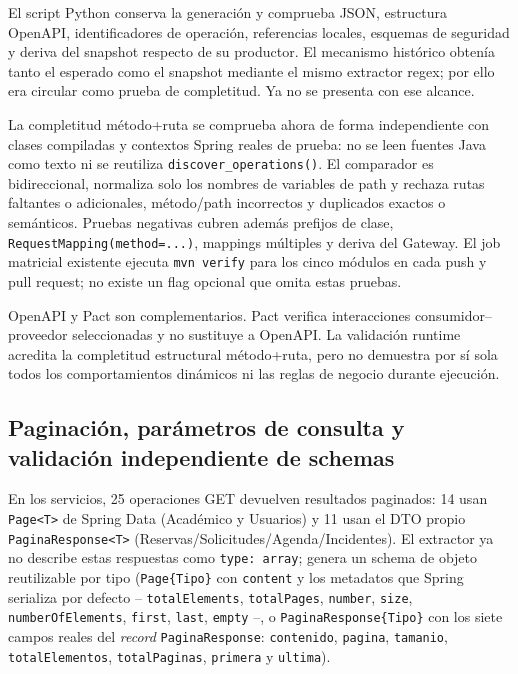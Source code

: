 El script Python conserva la generación y comprueba JSON, estructura OpenAPI,
identificadores de operación, referencias locales, esquemas de seguridad y
deriva del snapshot respecto de su productor. El mecanismo histórico obtenía
tanto el esperado como el snapshot mediante el mismo extractor regex; por ello
era circular como prueba de completitud. Ya no se presenta con ese alcance.

La completitud método+ruta se comprueba ahora de forma independiente con clases
compiladas y contextos Spring reales de prueba: no se leen fuentes Java como
texto ni se reutiliza \texttt{discover\_operations()}. El comparador es
bidireccional, normaliza solo los nombres de variables de path y rechaza rutas
faltantes o adicionales, método/path incorrectos y duplicados exactos o
semánticos. Pruebas negativas cubren además prefijos de clase,
\texttt{RequestMapping(method=...)}, mappings múltiples y deriva del Gateway.
El job matricial existente ejecuta \texttt{mvn verify} para los cinco módulos en
cada push y pull request; no existe un flag opcional que omita estas pruebas.

OpenAPI y Pact son complementarios. Pact verifica interacciones
consumidor--proveedor seleccionadas y no sustituye a OpenAPI. La validación
runtime acredita la completitud estructural método+ruta, pero no demuestra por
sí sola todos los comportamientos dinámicos ni las reglas de negocio durante
ejecución.

\subsection{Paginación, parámetros de consulta y validación independiente de schemas}

En los servicios, 25 operaciones GET devuelven resultados paginados: 14 usan
\texttt{Page<T>} de Spring Data (Académico y Usuarios) y 11 usan el DTO propio
\texttt{PaginaResponse<T>} (Reservas/Solicitudes/Agenda/Incidentes). El
extractor ya no describe estas respuestas como \texttt{type: array}; genera un
schema de objeto reutilizable por tipo (\texttt{Page\{Tipo\}} con
\texttt{content} y los metadatos que Spring serializa por defecto --
\texttt{totalElements}, \texttt{totalPages}, \texttt{number}, \texttt{size},
\texttt{numberOfElements}, \texttt{first}, \texttt{last}, \texttt{empty} --, o
\texttt{PaginaResponse\{Tipo\}} con los siete campos reales del \textit{record}
\texttt{PaginaResponse}: \texttt{contenido}, \texttt{pagina}, \texttt{tamanio},
\texttt{totalElementos}, \texttt{totalPaginas}, \texttt{primera} y
\texttt{ultima}).

